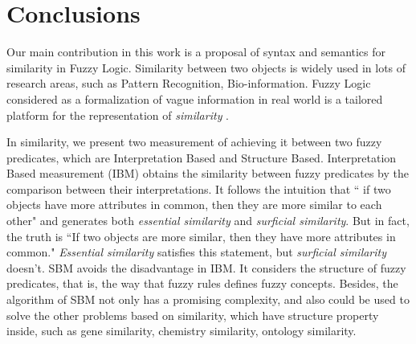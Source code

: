 \documentclass[Thesis.tex]{subfiles}
\begin{document}
\section{Conclusions}
\label{chap:Conclusions}

Our main contribution in this work is a proposal of syntax and semantics for similarity
 in Fuzzy Logic.
Similarity between two objects is widely used in lots of research areas, such as Pattern Recognition, Bio-information. 
Fuzzy Logic considered as a formalization of vague information in real world is a tailored platform for the representation of \textit{similarity} .

In similarity, we present two measurement of achieving it between two fuzzy predicates, which are Interpretation Based and Structure Based. Interpretation Based measurement (IBM) obtains the similarity between fuzzy predicates by the comparison between their interpretations. 
It follows the intuition that `` if two objects have more attributes in common, then they are more similar to each other" and generates both \textit{essential similarity} and \textit{surficial similarity}.
But in fact, the truth is ``If two objects are more similar, then they have more attributes in common." 
\textit{Essential similarity} satisfies this statement, but \textit{surficial similarity} doesn't. SBM avoids the disadvantage in IBM. It considers the structure of fuzzy predicates, that is, the way that fuzzy rules defines fuzzy concepts. Besides, the algorithm of SBM not only has a promising complexity, and also could be used to solve the other problems based on similarity, which have structure property inside, such as gene similarity, chemistry similarity, ontology similarity.

\end{document}
